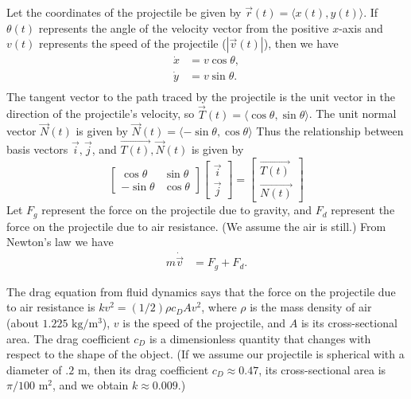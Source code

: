Let the coordinates of the projectile be given by $\vec{r}(t) = \langle x(t), y(t) \rangle$.
If $\theta(t)$ represents the angle of the velocity vector from the positive $x$-axis and $v(t)$ represents the speed of the projectile ($ |\vec{v}(t) |$), then we have 
\begin{align*}
\dot{x} &= v\cos{\theta},\\
\dot{y} &= v\sin{\theta}.\\
\end{align*}
The tangent vector to the path traced by the projectile is the unit vector in the direction of the projectile's velocity, so $\vec{T}(t) = \langle \cos{\theta}, \sin{\theta} \rangle$.
The unit normal vector $\vec{N} (t)$ is given by $\vec{N} (t)= \langle -\sin{\theta}, \cos{\theta} \rangle$
Thus the relationship between basis vectors $\vec{i}, \vec{j}$, and $\vec{T(t)}, \vec{N}(t)$ is given by 
\[\left[\begin{array}{cc}\cos{\theta} & \sin{\theta} \\-\sin{\theta} & \cos{\theta}\end{array}\right] \left[\begin{array}{c}\vec{i} \\\vec{j}\end{array}\right] = \left[\begin{array}{c}\vec{T(t)} \\\vec{N(t)}\end{array}\right]\]
Let $F_g$ represent the force on the projectile due to gravity, and $F_d$ represent the force on the projectile due to air resistance. (We assume the air is still.)
From Newton's law we have
\begin{align*}
m \dot{\vec{v}} &= F_g + F_d.
\end{align*}

The drag equation from fluid dynamics says that the force on the projectile due to air resistance is $k v^2 = (1/2)\rho c_D A v^2$, where $\rho$ is the mass density of air (about $1.225$ $\text{kg}/\text{m}^3$), $v$ is the speed of the projectile, and $A$ is its cross-sectional area.
The drag coefficient $c_D$ is a dimensionless quantity that changes with respect to the shape of the object.
(If we assume our projectile is spherical with a diameter of $.2$ m, then its drag coefficient $c_D \approx 0.47$, its cross-sectional area is $\pi/100$ $ \text{m}^2$, and we obtain $k \approx 0.009$.)

